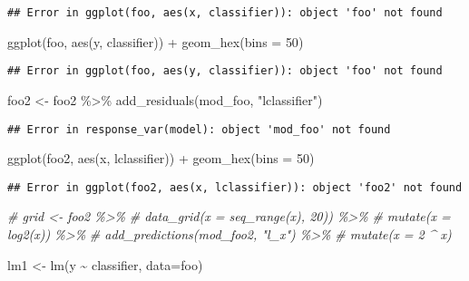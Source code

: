 \documentclass[
]{article}
\newenvironment{Shaded}{\begin{snugshade}}{\end{snugshade}}
\newcommand{\AttributeTok}[1]{\textcolor[rgb]{0.77,0.63,0.00}{#1}}
\newcommand{\CommentTok}[1]{\textcolor[rgb]{0.56,0.35,0.01}{\textit{#1}}}
\newcommand{\DecValTok}[1]{\textcolor[rgb]{0.00,0.00,0.81}{#1}}
\newcommand{\FunctionTok}[1]{\textcolor[rgb]{0.00,0.00,0.00}{#1}}
\newcommand{\NormalTok}[1]{#1}
\newcommand{\OtherTok}[1]{\textcolor[rgb]{0.56,0.35,0.01}{#1}}
\newcommand{\SpecialCharTok}[1]{\textcolor[rgb]{0.00,0.00,0.00}{#1}}
\newcommand{\StringTok}[1]{\textcolor[rgb]{0.31,0.60,0.02}{#1}}
\begin{document}
\begin{verbatim}
## Error in ggplot(foo, aes(x, classifier)): object 'foo' not found
\end{verbatim}

\begin{Shaded}
\begin{Highlighting}[]
\FunctionTok{ggplot}\NormalTok{(foo, }\FunctionTok{aes}\NormalTok{(y, classifier)) }\SpecialCharTok{+} 
  \FunctionTok{geom\_hex}\NormalTok{(}\AttributeTok{bins =} \DecValTok{50}\NormalTok{)}
\end{Highlighting}
\end{Shaded}

\begin{verbatim}
## Error in ggplot(foo, aes(y, classifier)): object 'foo' not found
\end{verbatim}

\begin{Shaded}
\begin{Highlighting}[]
\NormalTok{foo2 }\OtherTok{\textless{}{-}}\NormalTok{ foo2 }\SpecialCharTok{\%\textgreater{}\%} 
  \FunctionTok{add\_residuals}\NormalTok{(mod\_foo, }\StringTok{"lclassifier"}\NormalTok{)}
\end{Highlighting}
\end{Shaded}

\begin{verbatim}
## Error in response_var(model): object 'mod_foo' not found
\end{verbatim}

\begin{Shaded}
\begin{Highlighting}[]
\FunctionTok{ggplot}\NormalTok{(foo2, }\FunctionTok{aes}\NormalTok{(x, lclassifier)) }\SpecialCharTok{+} 
  \FunctionTok{geom\_hex}\NormalTok{(}\AttributeTok{bins =} \DecValTok{50}\NormalTok{)}
\end{Highlighting}
\end{Shaded}

\begin{verbatim}
## Error in ggplot(foo2, aes(x, lclassifier)): object 'foo2' not found
\end{verbatim}

\begin{Shaded}
\begin{Highlighting}[]
\CommentTok{\# grid \textless{}{-} foo2 \%\textgreater{}\% }
\CommentTok{\#   data\_grid(x = seq\_range(x), 20)) \%\textgreater{}\% }
\CommentTok{\#   mutate(x = log2(x)) \%\textgreater{}\% }
\CommentTok{\#   add\_predictions(mod\_foo2, "l\_x") \%\textgreater{}\% }
\CommentTok{\#   mutate(x = 2 \^{} x)}

\NormalTok{lm1 }\OtherTok{\textless{}{-}} \FunctionTok{lm}\NormalTok{(y }\SpecialCharTok{\textasciitilde{}}\NormalTok{ classifier, }\AttributeTok{data=}\NormalTok{foo)}
\end{Highlighting}
\end{Shaded}
\end{document}
